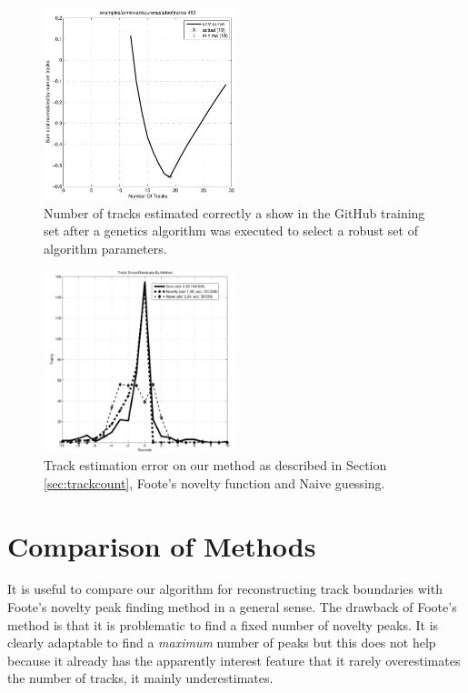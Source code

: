 \documentclass[twocolumn]{article}
\begin{document}
\begin{figure}
	\centering
	\includegraphics[width=0.5\textwidth]{images/trackestimate}
	\caption{Number of tracks estimated correctly a show in the GitHub training set after a genetics algorithm was executed to select a robust set of algorithm parameters.}
	\label{fig:github_trackestimation}
\end{figure}

\begin{figure}
	\centering
	\includegraphics[width=0.5\textwidth]{images/trackshift}
	\caption{Track estimation error on our method as described in Section \ref{sec:trackcount}, Foote's novelty function and Naive guessing. }
	\label{fig:track_shift}
\end{figure}

\section{Comparison of Methods}

It is useful to compare our algorithm for reconstructing track boundaries with Foote's novelty peak finding method in a general sense. The drawback of Foote's method is that it is problematic to find a fixed number of novelty peaks. It is clearly adaptable to find a \textit{maximum} number of peaks but this does not help because it already has the apparently interest feature that it rarely overestimates the number of tracks, it mainly underestimates.
\end{document}
